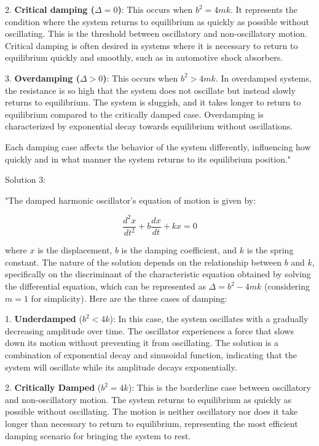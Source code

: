 2. \textbf{Critical damping (\(\Delta = 0\))}: This occurs when \(b^2 = 4mk\). It represents the condition where the system returns to equilibrium as quickly as possible without oscillating. This is the threshold between oscillatory and non-oscillatory motion. Critical damping is often desired in systems where it is necessary to return to equilibrium quickly and smoothly, such as in automotive shock absorbers.

3. \textbf{Overdamping (\(\Delta > 0\))}: This occurs when \(b^2 > 4mk\). In overdamped systems, the resistance is so high that the system does not oscillate but instead slowly returns to equilibrium. The system is sluggish, and it takes longer to return to equilibrium compared to the critically damped case. Overdamping is characterized by exponential decay towards equilibrium without oscillations.

Each damping case affects the behavior of the system differently, influencing how quickly and in what manner the system returns to its equilibrium position."

Solution 3:

"The damped harmonic oscillator's equation of motion is given by:

\[
\frac{d^{2}x}{dt^{2}} + b\frac{dx}{dt}+kx=0
\]

where \(x\) is the displacement, \(b\) is the damping coefficient, and \(k\) is the spring constant. The nature of the solution depends on the relationship between \(b\) and \(k\), specifically on the discriminant of the characteristic equation obtained by solving the differential equation, which can be represented as \(\Delta = b^2 - 4mk\) (considering \(m=1\) for simplicity). Here are the three cases of damping:

1. \textbf{Underdamped} (\(b^2 < 4k\)): In this case, the system oscillates with a gradually decreasing amplitude over time. The oscillator experiences a force that slows down its motion without preventing it from oscillating. The solution is a combination of exponential decay and sinusoidal function, indicating that the system will oscillate while its amplitude decays exponentially.

2. \textbf{Critically Damped} (\(b^2 = 4k\)): This is the borderline case between oscillatory and non-oscillatory motion. The system returns to equilibrium as quickly as possible without oscillating. The motion is neither oscillatory nor does it take longer than necessary to return to equilibrium, representing the most efficient damping scenario for bringing the system to rest.

